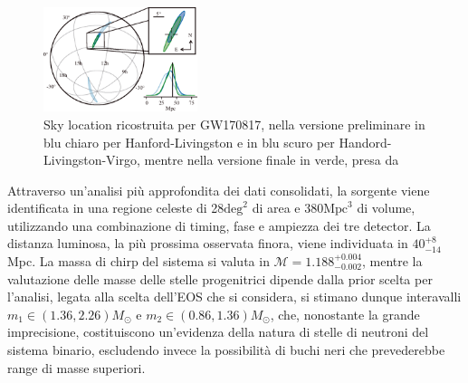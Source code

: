 \begin{figure}
	\vspace{-22pt}
	\begin{center}
		\includegraphics[width=0.4\textwidth]{figures/Capitolo_2/skymap.png}
	\end{center}
	\vspace{-5pt}
	\caption{Sky location ricostruita per GW170817, nella versione preliminare in blu chiaro per Hanford-Livingston e in blu scuro per Handord-Livingston-Virgo, mentre nella versione finale in verde, presa da \cite{Abbott_2019}}
	\label{fig:skymap}
	\vspace{-20pt}
\end{figure}
Attraverso un'analisi più approfondita dei dati consolidati, la sorgente viene identificata in una regione celeste di 28$\text{deg}^2$ di area e $380\text{Mpc}^3$ di volume, utilizzando una combinazione di timing, fase e ampiezza dei tre detector. La distanza luminosa, la più prossima osservata finora, viene individuata in $40_{-14}^{+8}$Mpc. La massa di chirp del sistema si valuta in $\mathcal{M}=1.188_{-0.002}^{+0.004}$, mentre la valutazione delle masse delle stelle progenitrici dipende dalla prior scelta per l'analisi, legata alla scelta dell'EOS che si considera, si stimano dunque interavalli $m_1 \in (1.36, 2.26)M_\odot$ e $m_2 \in (0.86, 1.36)M_\odot$, che, nonostante la grande imprecisione, costituiscono un'evidenza della natura di stelle di neutroni del sistema binario, escludendo invece la possibilità di buchi neri che prevederebbe range di masse superiori\cite{Abbott_2017a}.

